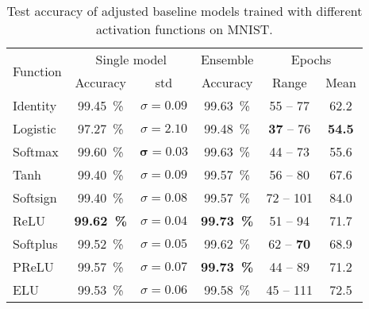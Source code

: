 \begin{table}[H]
    \centering
    \begin{tabular}{lccccc}
    \toprule
    \multirow{2}{*}{Function} & \multicolumn{2}{c}{Single model}              & Ensemble & \multicolumn{2}{c}{Epochs}\\\cline{2-3}\cline{5-6}
                              & Accuracy             & std                    & Accuracy & Range & Mean \\\midrule
    Identity                  & \SI{99.45}{\percent} & $\sigma=0.09$          & \SI{99.63}{\percent} & 55 -- \hphantom{0}77  & 62.2\\%
    Logistic                  & \SI{97.27}{\percent} & $\sigma=2.10$          & \SI{99.48}{\percent} & \textbf{37} -- \hphantom{0}76  & \textbf{54.5}\\
    Softmax                   & \SI{99.60}{\percent} & $\boldsymbol{\sigma=0.03}$& \SI{99.63}{\percent} & 44 -- \hphantom{0}73  & 55.6\\
    Tanh                      & \SI{99.40}{\percent} & $\sigma=0.09$          & \SI{99.57}{\percent} & 56 -- \hphantom{0}80  & 67.6\\
    Softsign                  & \SI{99.40}{\percent} & $\sigma=0.08$          & \SI{99.57}{\percent} & 72 -- 101             & 84.0\\
    \gls{ReLU}                & \textbf{\SI{99.62}{\percent}} & \textbf{$\sigma=0.04$} & \textbf{\SI{99.73}{\percent}} & 51 -- \hphantom{0}94 & 71.7\\
    Softplus                  & \SI{99.52}{\percent} & $\sigma=0.05$          & \SI{99.62}{\percent} & 62 -- \hphantom{0}\textbf{70}  & 68.9\\
    \gls{PReLU}               & \SI{99.57}{\percent} & $\sigma=0.07$          & \textbf{\SI{99.73}{\percent}} & 44 -- \hphantom{0}89 & 71.2\\
    \gls{ELU}                 & \SI{99.53}{\percent} & $\sigma=0.06$          & \SI{99.58}{\percent} & 45 -- 111 & 72.5\\
    \bottomrule
    \end{tabular}
    \caption[Activation function evaluation results on MNIST]{Test accuracy of
             adjusted baseline models trained with different activation
             functions on MNIST.}
    \label{table:MNIST-accuracies-activation-functions}
\end{table}
